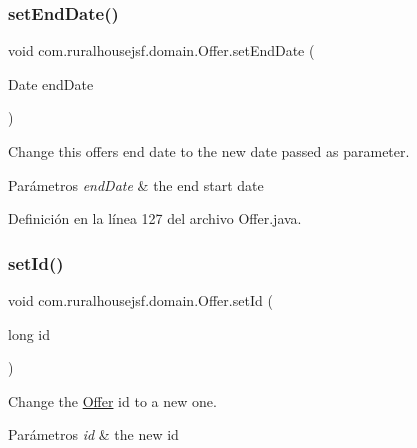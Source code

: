 \mbox{\label{classcom_1_1ruralhousejsf_1_1domain_1_1_offer_a4ee5091e976e14c9b34817e1c8225e01}} 
\subsubsection{\texorpdfstring{setEndDate()}{setEndDate()}}
{\footnotesize\ttfamily void com.\+ruralhousejsf.\+domain.\+Offer.\+set\+End\+Date (\begin{DoxyParamCaption}\item[{Date}]{end\+Date }\end{DoxyParamCaption})}

Change this offers end date to the new date passed as parameter.


\begin{DoxyParams}{Parámetros}
{\em end\+Date} & the end start date \\
\hline
\end{DoxyParams}


Definición en la línea 127 del archivo Offer.\+java.

\mbox{\label{classcom_1_1ruralhousejsf_1_1domain_1_1_offer_a470323b09c0c64417eb21c748d008045}} 
\subsubsection{\texorpdfstring{setId()}{setId()}}
{\footnotesize\ttfamily void com.\+ruralhousejsf.\+domain.\+Offer.\+set\+Id (\begin{DoxyParamCaption}\item[{long}]{id }\end{DoxyParamCaption})}

Change the \mbox{\hyperlink{classcom_1_1ruralhousejsf_1_1domain_1_1_offer}{Offer}} id to a new one.


\begin{DoxyParams}{Parámetros}
{\em id} & the new id \\
\hline
\end{DoxyParams}



